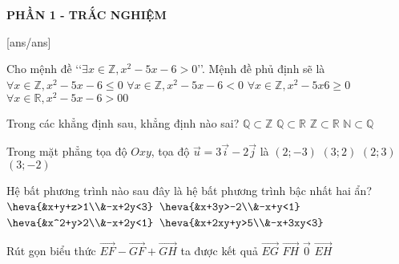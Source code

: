 
\begin{center}
	\textbf{PHẦN 1 - TRẮC NGHIỆM}
\end{center}
[ans/ans]
\begin{ex}%
	Cho mệnh đề \lq\lq $\exists x \in\mathbb{Z}, x^2-5x-6 > 0$\rq\rq. Mệnh đề phủ định sẽ là
	\choice
	{\True $\forall x\in\mathbb{Z}, x^2-5x-6\leq 0$}
	{$\forall x\in\mathbb{Z}, x^2-5x-6< 0$}
	{$\forall x\in\mathbb{Z}, x^2-5x6\geq 0$}
	{$\forall x\in\mathbb{R}, x^2-5x-6>0 0$}
\end{ex}
\begin{ex}%
	Trong các khẳng định sau, khẳng định nào sai?
	\choice
	{\True $\mathbb{Q}\subset \mathbb{Z}$}
	{$\mathbb{Q}\subset \mathbb{R}$}
	{$\mathbb{Z}\subset \mathbb{R}$}
	{$\mathbb{N}\subset \mathbb{Q}$}
\end{ex}
\begin{ex}%
	Trong mặt phẳng tọa độ $Oxy$, tọa độ $\overrightarrow{u}=3\overrightarrow{i}-2\overrightarrow{j}$ là
	\choice
	{$(2;-3)$}
	{$(3;2) $}
	{$(2;3)$}
	{\True $(3;-2)$}
\end{ex}
\begin{ex}%
	Hệ bất phương trình nào sau đây là hệ bất phương trình bậc nhất hai ẩn?
	\choice
	{$\heva{&x+y+z>1\\&-x+2y<3}$}
	{\True $\heva{&x+3y>-2\\&-x+y<1}$}
	{$\heva{&x^2+y>2\\&-x+2y<1}$}
	{$\heva{&x+2xy+y>5\\&-x+3xy<3}$}
\end{ex}
\begin{ex}%
	Rút gọn biểu thức $\overrightarrow{EF} - \overrightarrow{GF} + \overrightarrow{GH}$ ta được kết quả
	\choice
	{$\overrightarrow{EG}$}
	{$\overrightarrow{FH}$}
	{$\overrightarrow{0}$}
	{\True $\overrightarrow{EH}$}
\end{ex}

